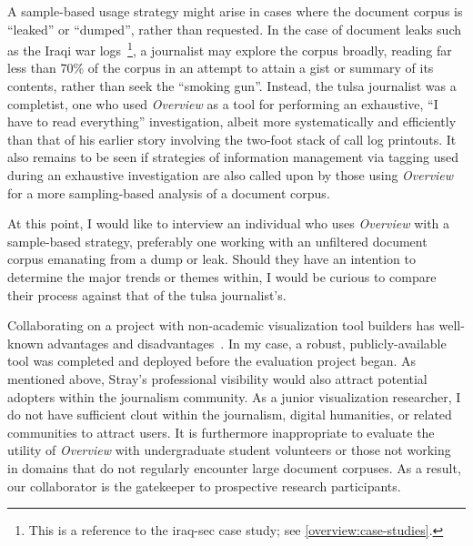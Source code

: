 A sample-based usage strategy might arise in cases where the document corpus is ``leaked'' or ``dumped'', rather than requested. 
In the case of document leaks such as the Iraqi war logs~\cite{Stray2012}\footnote{This is a reference to the {\sc iraq-sec} case study; see \autoref{overview:case-studies}.}, a journalist may explore the corpus broadly, reading far less than 70\% of the corpus in an attempt to attain a gist or summary of its contents, rather than seek the ``smoking gun''. 
Instead, the {\sc tulsa} journalist was a completist, one who used {\it Overview} as a tool for performing an exhaustive, ``I have to read everything'' investigation, albeit more systematically and efficiently than that of his earlier story involving the two-foot stack of call log printouts. 
It also remains to be seen if strategies of information management via tagging used during an exhaustive investigation are also called upon by those using {\it Overview} for a more sampling-based analysis of a document corpus.

At this point, I would like to interview an individual who uses {\it Overview} with a sample-based strategy, preferably one working with an unfiltered document corpus emanating from a dump or leak. 
Should they have an intention to determine the major trends or themes within, I would be curious to compare their process against that of the {\sc tulsa} journalist's. 

Collaborating on a project with non-academic visualization tool builders has well-known advantages and disadvantages~\cite{Sedlmair2011}. 
In my case, a robust, publicly-available tool was completed and deployed before the evaluation project began. 
As mentioned above, Stray's professional visibility would also attract potential adopters within the journalism community. 
As a junior visualization researcher, I do not have sufficient clout within the journalism, digital humanities, or related communities to attract users. 
It is furthermore inappropriate to evaluate the utility of {\it Overview} with undergraduate student volunteers or those not working in domains that do not regularly encounter large document corpuses. 
As a result, our collaborator is the gatekeeper to prospective research participants.

